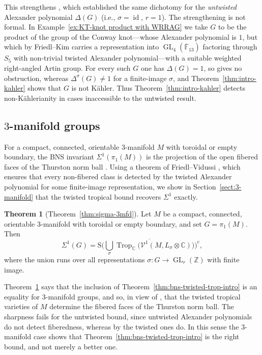 \documentclass[11pt]{amsart}
\theoremstyle{definition}
\newtheorem{theoremalph}{Theorem}
\newcommand{\Z}{\mathbb{Z}}
\newcommand{\C}{\mathbb{C}}
\newcommand{\F}{\mathbb{F}}
\newcommand{\VV}{\mathcal{V}}
\newcommand{\rS}{\mathrm{S}}
\DeclareMathOperator{\id}{id}
\DeclareMathOperator{\GL}{GL}
\DeclareMathOperator{\Trop}{Trop}
\newcommand{\compl}{\mathrm{c}}
\begin{document}
This strengthens \cite[Thm.~4.3(3)]{DPS-imrn}, which
established the same dichotomy for the \emph{untwisted}
Alexander polynomial $\Delta(G)$ (i.e., $\sigma = \id$, $r=1$).
The strengthening is not formal.  In
Example~\ref{ex:KT-knot product with WRRAG} we take $G$ to be the
product of the group of the Conway knot---whose Alexander polynomial is
$1$, but which by Friedl--Kim \cite{FK06} carries a representation into
$\GL_4(\overline{\F}_{13})$ factoring through $S_5$ with non-trivial
twisted Alexander polynomial---with a suitable weighted right-angled
Artin group.  For every such $G$ one has $\Delta(G)=1$, so
\cite[Thm.~4.3(3)]{DPS-imrn} gives no obstruction, whereas
$\Delta^{\sigma}(G)\ne 1$ for a finite-image $\sigma$, and
Theorem~\ref{thm:intro-kahler} shows that $G$ is not K\"ahler.  Thus
Theorem~\ref{thm:intro-kahler} detects non-K\"ahlerianity in cases
inaccessible to the untwisted result.

\subsection{$3$-manifold groups}
\label{apps:3mfd}

For a compact, connected, orientable $3$-manifold $M$ with
toroidal or empty boundary, the BNS invariant $\Sigma^1(\pi_1(M))$
is the projection of the open fibered faces of the Thurston norm
ball \cite[Thm.~E]{BNS}. Using a theorem of Friedl--Vidussi \cite{FV13},
which ensures that every non-fibered class is detected by the
twisted Alexander polynomial for some finite-image representation,
we show in Section~\ref{sect:3-manifold} that the twisted tropical
bound recovers $\Sigma^1$ exactly.

\begin{theoremalph}[Theorem~\ref{thm:sigma-3mfd}]
\label{thm:sigma-3mfd-intro}
Let $M$ be a compact, connected, orientable $3$-manifold with
toroidal or empty boundary, and set $G=\pi_1(M)$. Then
\[
\Sigma^1(G) = \rS\Bigg(\overline{\bigcup_{\sigma}
\Trop_\C\big(\VV^1(M,L_{\sigma}\otimes \C)\big)}\Bigg)^{\compl},
\]
where the union runs over all representations
$\sigma\colon G\to \GL_r(\Z)$ with finite image.
\end{theoremalph}

Theorem~\ref{thm:sigma-3mfd-intro} says that the inclusion of
Theorem~\ref{thm:bns-twisted-trop-intro} is an equality for
$3$-manifold groups, and so, in view of \cite[Thm.~E]{BNS}, that the
twisted tropical varieties of $M$ determine the fibered faces of the
Thurston norm ball.  The sharpness fails for the untwisted bound, since
untwisted Alexander polynomials do not detect fiberedness, whereas by
\cite{FV13} the twisted ones do.  In this sense the $3$-manifold case
shows that Theorem~\ref{thm:bns-twisted-trop-intro} is the right bound,
and not merely a better one.
\end{document}
